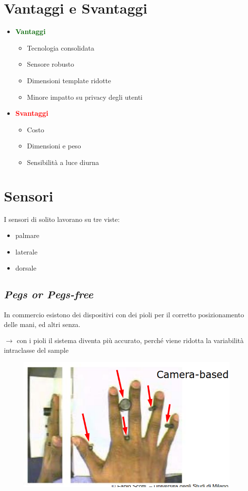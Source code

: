 \documentclass{report}
\begin{document}
\section{Vantaggi e Svantaggi}
\begin{itemize}
    \item \textcolor{darkgreen}{\textbf{Vantaggi}}
    \begin{itemize}
        \item Tecnologia consolidata
        \item Sensore robusto 
        \item Dimensioni template ridotte 
        \item Minore impatto su privacy degli utenti 
    \end{itemize}
    \item \textcolor{red}{\textbf{Svantaggi}}
    \begin{itemize}
        \item Costo 
        \item Dimensioni e peso 
        \item Sensibilità a luce diurna
    \end{itemize}
\end{itemize}

\section{Sensori}
I sensori di solito lavorano su tre viste:
\begin{itemize}
    \item palmare 
    \item laterale 
    \item dorsale
\end{itemize}

\subsection{\textit{Pegs or Pegs-free}}
In commercio esistono dei dispositivi con dei pioli per il corretto 
posizionamento delle mani, ed altri senza.

$\rightarrow$ con i pioli il sistema diventa più accurato, perché viene 
ridotta la variabilità intraclasse del sample  

\begin{figure}[ht]
    \centering
    \includegraphics[width=1\linewidth]{images/pioli.png}
\end{figure}
\end{document}
